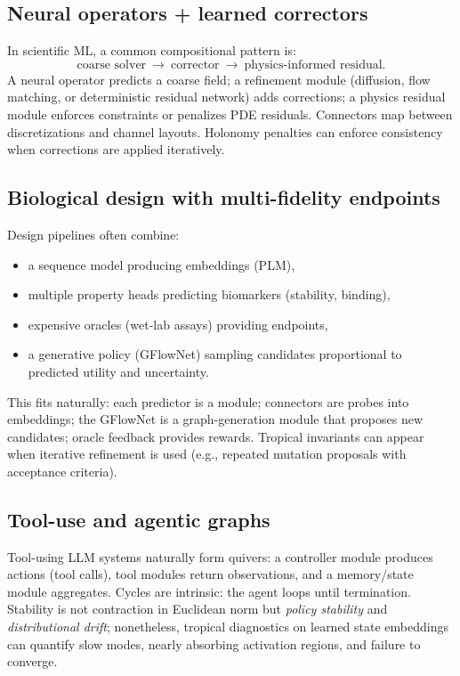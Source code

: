 \documentclass[11pt]{article}
\theoremstyle{definition}
\theoremstyle{plain}
\theoremstyle{remark}
\begin{document}
\subsection{Neural operators + learned correctors}
In scientific ML, a common compositional pattern is:
\[
\text{coarse solver} \ \to\ \text{corrector}\ \to\ \text{physics-informed residual}.
\]
A neural operator predicts a coarse field; a refinement module (diffusion, flow matching, or deterministic residual network) adds corrections; a physics residual module enforces constraints or penalizes PDE residuals.
Connectors map between discretizations and channel layouts.
Holonomy penalties can enforce consistency when corrections are applied iteratively.

\subsection{Biological design with multi-fidelity endpoints}
Design pipelines often combine:
\begin{itemize}[leftmargin=2em]
\item a sequence model producing embeddings (PLM),
\item multiple property heads predicting biomarkers (stability, binding),
\item expensive oracles (wet-lab assays) providing endpoints,
\item a generative policy (GFlowNet) sampling candidates proportional to predicted utility and uncertainty.
\end{itemize}
This fits naturally: each predictor is a module; connectors are probes into embeddings; the GFlowNet is a graph-generation module that proposes new candidates; oracle feedback provides rewards.
Tropical invariants can appear when iterative refinement is used (e.g., repeated mutation proposals with acceptance criteria).

\subsection{Tool-use and agentic graphs}
Tool-using LLM systems naturally form quivers:
a controller module produces actions (tool calls), tool modules return observations, and a memory/state module aggregates.
Cycles are intrinsic: the agent loops until termination.
Stability is not contraction in Euclidean norm but \emph{policy stability} and \emph{distributional drift}; nonetheless, tropical diagnostics on learned state embeddings can quantify slow modes, nearly absorbing activation regions, and failure to converge.
\end{document}
